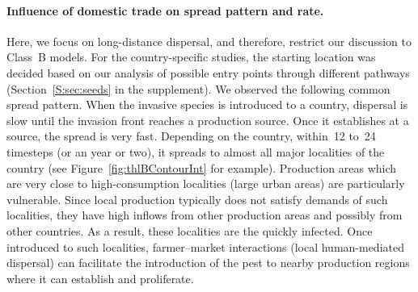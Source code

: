 \documentclass[11pt]{article}
\theoremstyle{definition}
\begin{document}
\paragraph{Influence of domestic trade on spread pattern and rate.}
Here, we focus on long-distance dispersal, and therefore, restrict our
discussion to Class~B models. For the country-specific studies, the
starting location was decided based on our analysis of possible entry
points through different pathways (Section~\ref{S:sec:seeds} in the
supplement).  We observed the following common spread pattern.  When the
invasive species is introduced to a country, dispersal is slow until the
invasion front reaches a {production source}. Once it establishes at a
source, the spread is very fast.  Depending on the country, within~12 to~24
timesteps (or an year or two), it spreads to almost all major localities of
the country (see Figure~\ref{fig:thlBContourInt} for example). Production
areas which are very close to high-consumption localities (large urban
areas) are particularly vulnerable. Since local production typically does
not satisfy demands of such localities, they have high inflows from other
production areas and possibly from other countries. As a result, these
localities are the quickly infected. Once introduced to such localities,
farmer--market interactions (local human-mediated dispersal) can facilitate
the introduction of the pest to nearby production regions where it can
establish and proliferate.
\end{document}

